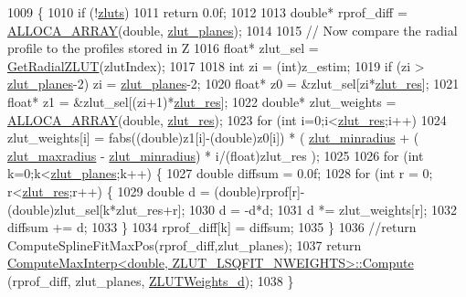\begin{DoxyCode}
1009 \{
1010     \textcolor{keywordflow}{if} (!\hyperlink{class_c_p_u_tracker_ac187d3124a66c6743c2037bb82d9a67d}{zluts})
1011         \textcolor{keywordflow}{return} 0.0f;
1012     
1013     \textcolor{keywordtype}{double}* rprof\_diff = \hyperlink{std__incl_8h_a37dbccb865134ee3a70c5044b365ded7}{ALLOCA\_ARRAY}(\textcolor{keywordtype}{double}, \hyperlink{class_c_p_u_tracker_ad28d60ad587ae3f89b9dba7f82c135f7}{zlut\_planes});
1014 
1015     \textcolor{comment}{// Now compare the radial profile to the profiles stored in Z}
1016     \textcolor{keywordtype}{float}* zlut\_sel = \hyperlink{class_c_p_u_tracker_a8a8ca2636eca91688ff90d68d04ad69d}{GetRadialZLUT}(zlutIndex);
1017 
1018     \textcolor{keywordtype}{int} zi = (int)z\_estim;
1019     \textcolor{keywordflow}{if} (zi > \hyperlink{class_c_p_u_tracker_ad28d60ad587ae3f89b9dba7f82c135f7}{zlut\_planes}-2) zi = \hyperlink{class_c_p_u_tracker_ad28d60ad587ae3f89b9dba7f82c135f7}{zlut\_planes}-2;
1020     \textcolor{keywordtype}{float}* z0 = &zlut\_sel[zi*\hyperlink{class_c_p_u_tracker_a058eae282c9bf847cd8e39664688c5bc}{zlut\_res}];
1021     \textcolor{keywordtype}{float}* z1 = &zlut\_sel[(zi+1)*\hyperlink{class_c_p_u_tracker_a058eae282c9bf847cd8e39664688c5bc}{zlut\_res}];
1022     \textcolor{keywordtype}{double}* zlut\_weights = \hyperlink{std__incl_8h_a37dbccb865134ee3a70c5044b365ded7}{ALLOCA\_ARRAY}(\textcolor{keywordtype}{double}, \hyperlink{class_c_p_u_tracker_a058eae282c9bf847cd8e39664688c5bc}{zlut\_res});
1023     \textcolor{keywordflow}{for} (\textcolor{keywordtype}{int} i=0;i<\hyperlink{class_c_p_u_tracker_a058eae282c9bf847cd8e39664688c5bc}{zlut\_res};i++)
1024         zlut\_weights[i] = fabs((\textcolor{keywordtype}{double})z1[i]-(\textcolor{keywordtype}{double})z0[i]) * ( \hyperlink{class_c_p_u_tracker_a18ed4e4c7e10ea5728eaf4d36b864fdc}{zlut\_minradius} + (
      \hyperlink{class_c_p_u_tracker_aac96fa28c0ee4462e176e78c9ec91335}{zlut\_maxradius} - \hyperlink{class_c_p_u_tracker_a18ed4e4c7e10ea5728eaf4d36b864fdc}{zlut\_minradius}) * i/(\textcolor{keywordtype}{float})zlut\_res );
1025 
1026     for (\textcolor{keywordtype}{int} k=0;k<\hyperlink{class_c_p_u_tracker_ad28d60ad587ae3f89b9dba7f82c135f7}{zlut\_planes};k++) \{
1027         \textcolor{keywordtype}{double} diffsum = 0.0f;
1028         \textcolor{keywordflow}{for} (\textcolor{keywordtype}{int} r = 0; r<\hyperlink{class_c_p_u_tracker_a058eae282c9bf847cd8e39664688c5bc}{zlut\_res};r++) \{
1029             \textcolor{keywordtype}{double} d = (double)rprof[r]-(\textcolor{keywordtype}{double})zlut\_sel[k*zlut\_res+r];
1030             d = -d*d;
1031             d *= zlut\_weights[r];
1032             diffsum += d;
1033         \}
1034         rprof\_diff[k] = diffsum;
1035     \}
1036     \textcolor{comment}{//return ComputeSplineFitMaxPos(rprof\_diff,zlut\_planes);}
1037     \textcolor{keywordflow}{return} \hyperlink{class_compute_max_interp_aa1ec2481d8a866f624f05ba53fb2d3bc}{ComputeMaxInterp<double, ZLUT\_LSQFIT\_NWEIGHTS>::Compute}
      (rprof\_diff, zlut\_planes, \hyperlink{cpu__tracker_8cpp_a79c9b3cd0d6bf4409d49ad9b784f7f87}{ZLUTWeights\_d});
1038 \}
\end{DoxyCode}

